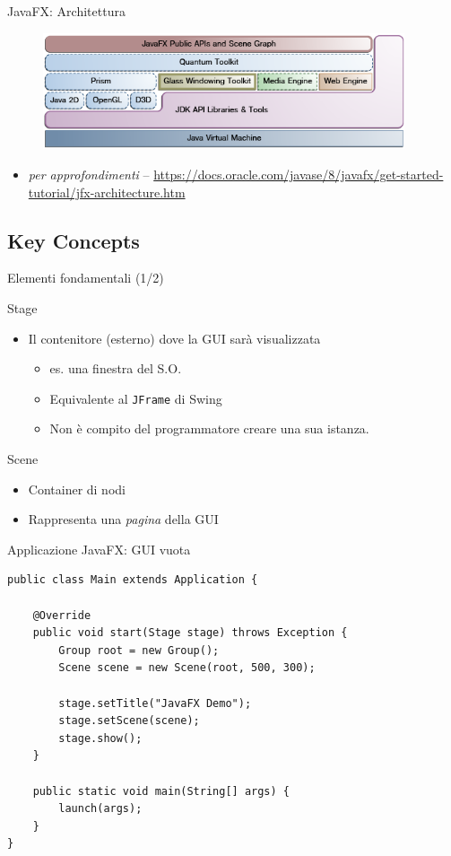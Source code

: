 \documentclass[presentation]{beamer}
\begin{document}
\begin{frame}{JavaFX: Architettura}
\begin{figure}
\includegraphics[width=0.95\textwidth]{img/javafx-architecture.png}
\end{figure}
\begin{itemize}
\item \emph{per approfondimenti} -- \url{https://docs.oracle.com/javase/8/javafx/get-started-tutorial/jfx-architecture.htm}
\end{itemize}
\end{frame}

\subsection{Key Concepts}

\begin{frame}{Elementi fondamentali (1/2)}
\begin{block}{Stage}
\begin{itemize}
\item Il contenitore (esterno) dove la GUI sarà visualizzata
\begin{itemize}
\item es. una finestra del S.O.
\item Equivalente al \texttt{JFrame} di Swing
\item Non è compito del programmatore creare una sua istanza.
\end{itemize}
\end{itemize}
\end{block}

\begin{block}{Scene}
\begin{itemize}
\item Container di nodi
\item Rappresenta una \emph{pagina} della GUI
\end{itemize}
\end{block}
\end{frame}

\begin{frame}[fragile]{Applicazione JavaFX: GUI vuota}
\begin{lstlisting}
public class Main extends Application {

	@Override
	public void start(Stage stage) throws Exception {
		Group root = new Group();
		Scene scene = new Scene(root, 500, 300);
		
		stage.setTitle("JavaFX Demo");
		stage.setScene(scene);
		stage.show();
	}
	
	public static void main(String[] args) {
		launch(args);
	}
}
\end{lstlisting}
\end{frame}
\end{document}
